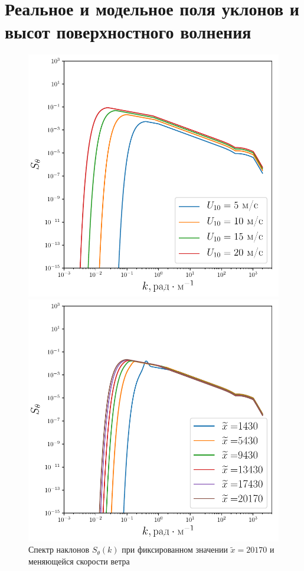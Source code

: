 \section{Реальное и модельное поля уклонов и высот поверхностного волнения}
\begin{figure}[h!]
	\begin{minipage}{0.49\linewidth}
			\centering
			\includegraphics[width=\linewidth]{fig/full_spectrum3.pdf}
			\caption{Спектр наклонов $S_{\theta}(k)$ при фиксированном значении $\tilde x=20170$ и меняющейся скорости ветра}		
			\label{fig:full_spectrum3}
	\end{minipage}
	\hfill
	\begin{minipage}{0.49\linewidth}
			\centering
			\includegraphics[width=\linewidth]{fig/full_spectrum4.pdf}

\end{minipage}
\end{figure}
